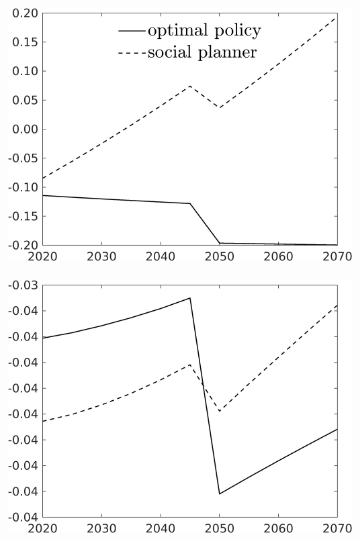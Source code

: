 \begin{figure}[h!!!]
	\centering
	\caption{Efficient and optimal allocation in deviation from laissez-faire without knowledge spillovers	}\label{fig:optAll_percLf_dyn_nokn}
	\begin{subfigure}[]{0.32\textwidth}
		\includegraphics[width=1\textwidth]{../../codding_model/own_basedOnFried/optimalPol_010922_revision/figures/all_13Sept22_Tplus30/C_PercentageLFDyn_Target_regime4_knspil1_spillover0_noskill0_sep0_xgrowth0_PV1_etaa0.79_lgd1.png}
	\end{subfigure}
	\begin{subfigure}[]{0.32\textwidth}
		\includegraphics[width=1\textwidth]{../../codding_model/own_basedOnFried/optimalPol_010922_revision/figures/all_13Sept22_Tplus30/hh_PercentageLFDyn_Target_regime4_knspil1_spillover0_noskill0_sep0_xgrowth0_PV1_etaa0.79_lgd0.png}

\end{subfigure}
\end{figure}
